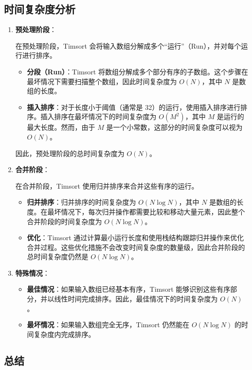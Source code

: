 \documentclass{report}
\begin{document}
\subsection{时间复杂度分析}
\begin{enumerate}
    \item \textbf{预处理阶段}：

    在预处理阶段，Timsort 会将输入数组分解成多个“运行”（Run），并对每个运行进行排序。
    \begin{itemize}
        \item \textbf{分段（Run）}：Timsort 将数组分解成多个部分有序的子数组。这个步骤在最坏情况下需要扫描整个数组，因此时间复杂度为 $O(N)$，其中 $N$ 是数组的长度。
        \item \textbf{插入排序}：对于长度小于阈值（通常是 32）的运行，使用插入排序进行排序。插入排序在最坏情况下的时间复杂度为 $O(M^2)$，其中 $M$ 是运行的最大长度。然而，由于 $M$ 是一个小常数，这部分的时间复杂度可以视为 $O(N)$。
    \end{itemize}
    因此，预处理阶段的总时间复杂度为 $O(N)$。

    \item \textbf{合并阶段}：

    在合并阶段，Timsort 使用归并排序来合并这些有序的运行。
    \begin{itemize}
        \item \textbf{归并排序}：归并排序的时间复杂度为 $O(N \log N)$，其中 $N$ 是数组的长度。在最坏情况下，每次归并操作都需要比较和移动大量元素，因此整个合并阶段的时间复杂度为 $O(N \log N)$。
        \item \textbf{优化}：Timsort 通过计算最小运行长度和使用栈结构跟踪归并操作来优化合并过程。这些优化措施不会改变时间复杂度的数量级，因此合并阶段的总时间复杂度仍然是 $O(N \log N)$。
    \end{itemize}

    \item \textbf{特殊情况}：
    \begin{itemize}
        \item \textbf{最佳情况}：如果输入数组已经基本有序，Timsort 能够识别这些有序部分，并以线性时间完成排序。因此，最佳情况下的时间复杂度为 $O(N)$。
        \item \textbf{最坏情况}：如果输入数组完全无序，Timsort 仍然能在 $O(N \log N)$ 的时间复杂度内完成排序。
    \end{itemize}
\end{enumerate}

\subsection*{总结}
\end{document}
